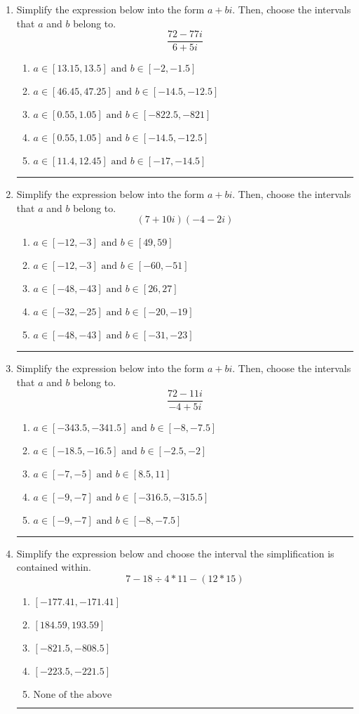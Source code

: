 \documentclass[14pt]{extbook}
\newcommand{\litem}[1]{\item#1\hspace*{-1cm}\rule{\textwidth}{0.4pt}}
\begin{document}
\begin{enumerate}
{\begin{enumerate}[label=\Alph*.]
\end{enumerate} }
\litem{
Simplify the expression below into the form $a+bi$. Then, choose the intervals that $a$ and $b$ belong to.\[ \frac{72 - 77 i}{6 + 5 i} \]\begin{enumerate}[label=\Alph*.]
\item \( a \in [13.15, 13.5] \text{ and } b \in [-2, -1.5] \)
\item \( a \in [46.45, 47.25] \text{ and } b \in [-14.5, -12.5] \)
\item \( a \in [0.55, 1.05] \text{ and } b \in [-822.5, -821] \)
\item \( a \in [0.55, 1.05] \text{ and } b \in [-14.5, -12.5] \)
\item \( a \in [11.4, 12.45] \text{ and } b \in [-17, -14.5] \)

\end{enumerate} }
\litem{
Simplify the expression below into the form $a+bi$. Then, choose the intervals that $a$ and $b$ belong to.\[ (7 + 10 i)(-4 - 2 i) \]\begin{enumerate}[label=\Alph*.]
\item \( a \in [-12, -3] \text{ and } b \in [49, 59] \)
\item \( a \in [-12, -3] \text{ and } b \in [-60, -51] \)
\item \( a \in [-48, -43] \text{ and } b \in [26, 27] \)
\item \( a \in [-32, -25] \text{ and } b \in [-20, -19] \)
\item \( a \in [-48, -43] \text{ and } b \in [-31, -23] \)

\end{enumerate} }
\litem{
Simplify the expression below into the form $a+bi$. Then, choose the intervals that $a$ and $b$ belong to.\[ \frac{72 - 11 i}{-4 + 5 i} \]\begin{enumerate}[label=\Alph*.]
\item \( a \in [-343.5, -341.5] \text{ and } b \in [-8, -7.5] \)
\item \( a \in [-18.5, -16.5] \text{ and } b \in [-2.5, -2] \)
\item \( a \in [-7, -5] \text{ and } b \in [8.5, 11] \)
\item \( a \in [-9, -7] \text{ and } b \in [-316.5, -315.5] \)
\item \( a \in [-9, -7] \text{ and } b \in [-8, -7.5] \)

\end{enumerate} }
\litem{
Simplify the expression below and choose the interval the simplification is contained within.\[ 7 - 18 \div 4 * 11 - (12 * 15) \]\begin{enumerate}[label=\Alph*.]
\item \( [-177.41, -171.41] \)
\item \( [184.59, 193.59] \)
\item \( [-821.5, -808.5] \)
\item \( [-223.5, -221.5] \)
\item \( \text{None of the above} \)


\end{enumerate}}
\end{enumerate}
\end{document}
